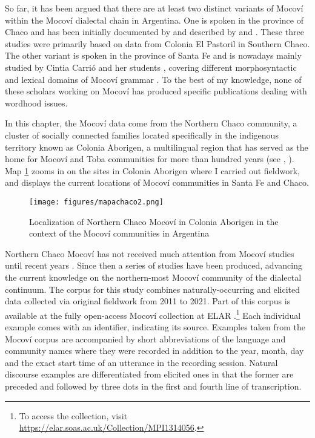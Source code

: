 \documentclass[output=paper]{langscibook}
\begin{document}
So far, it has been argued that there are at least two distinct variants of Mocoví within the Mocoví dialectal chain in Argentina. One is spoken in the province of Chaco and has been initially documented by \citet{Buckwalter1995} and described by \citet{Grondona1998} and \citet{Gualdieri1998}. These three studies were primarily based on data from Colonia El Pastoril in Southern Chaco. The other variant is spoken in the province of Santa Fe and is nowadays mainly studied by Cintia Carrió and her students \citep[see, for instance,][]{Carrio2009,Carrio2011, Carrio2015a, Carrio2019, Rabasedas2017}, covering different morphosyntactic and lexical domains of Mocoví grammar \citep[but see also][]{Gualdieri2006}. To the best of my knowledge, none of these scholars working on Mocoví has produced specific publications dealing with wordhood issues. 

In this chapter, the Mocoví data come from the Northern Chaco community, a cluster of socially connected families located specifically in the indigenous territory known as Colonia Aborigen, a multilingual region that has served as the home for Mocoví and Toba communities for more than hundred years  (see \citealt[][vol II]{Hermitte1995a}, \citealt{Salamanca2008}). Map \ref{map:mocovilocalization} zooms in on the sites in Colonia Aborigen where I carried out fieldwork, and displays the current locations of Mocoví communities in Santa Fe and Chaco.

\begin{figure}
\captionsetup{name=Map}
    \centering
   \texttt{[image: figures/mapachaco2.png]}
    \caption{Localization of Northern Chaco Mocoví in Colonia Aborigen in the context of the Mocoví communities in Argentina}
    \label{map:mocovilocalization}
\end{figure}

 Northern Chaco Mocoví has not received much attention from Mocoví studies until recent years \citep[e.g.,][]{Juarez2013}. Since then a series of studies have been produced, advancing the current knowledge on the northern-most Mocoví community of the dialectal continuum. The corpus for this study combines naturally-occurring and elicited data collected via original fieldwork from 2011 to 2021. Part of this corpus is available at the fully open-access Mocoví collection at ELAR \citep{Juarez2019}.\footnote{To access the collection, visit \url{https://elar.soas.ac.uk/Collection/MPI1314056}.} Each individual example comes with an identifier, indicating its source. Examples taken from the Mocoví corpus are accompanied by short abbreviations of the language and community names where they were recorded in addition to the year, month, day and the exact start time of an utterance in the recording session. Natural discourse examples are differentiated from elicited ones in that the former are preceded and followed by three dots in the first and fourth line of transcription.  
\end{document}
